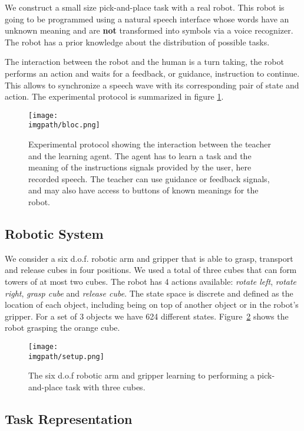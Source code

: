 We construct a small size pick-and-place task with a real robot. This robot is going to be programmed using a natural speech interface whose words have an unknown meaning and are \textbf{not} transformed into symbols via a voice recognizer. The robot has a prior knowledge about the distribution of possible tasks.

The interaction between the robot and the human is a turn taking, the robot performs an action and waits for a feedback, or guidance, instruction to continue. This allows to synchronize a speech wave with its corresponding pair of state and action. The experimental protocol is summarized in figure \ref{fig:lfui:bloc}.

\begin{figure}[!htbp]
  \centering
  \texttt{[image: \\imgpath/bloc.png]}
  \caption{Experimental protocol showing the interaction between the teacher and the learning agent. The agent has to learn a task and the meaning of the instructions signals provided by the user, here recorded speech. The teacher can use guidance or feedback signals, and may also have access to buttons of known meanings for the robot.}
  \label{fig:lfui:bloc}    
\end{figure}

\subsection{Robotic System}

We consider a six d.o.f. robotic arm and gripper that is able to grasp, transport and release cubes in four positions. We used a total of three cubes that can form towers of at most two cubes.  The robot has 4 actions available: \textit{rotate left}, \textit{rotate right}, \textit{grasp cube} and \textit{release cube}. The state space is discrete and defined as the location of each object, including being on top of another object or in the robot's gripper. For a set of 3 objects we have 624 different states. Figure~\ref{fig:lfui:setup} shows the robot grasping the orange cube. 

\begin{figure}[!htbp]
  \centering
  \texttt{[image: \\imgpath/setup.png]}
  \caption{The six d.o.f robotic arm and gripper learning to performing a pick-and-place task with three cubes.}
  \label{fig:lfui:setup}
\end{figure}

\subsection{Task Representation}

